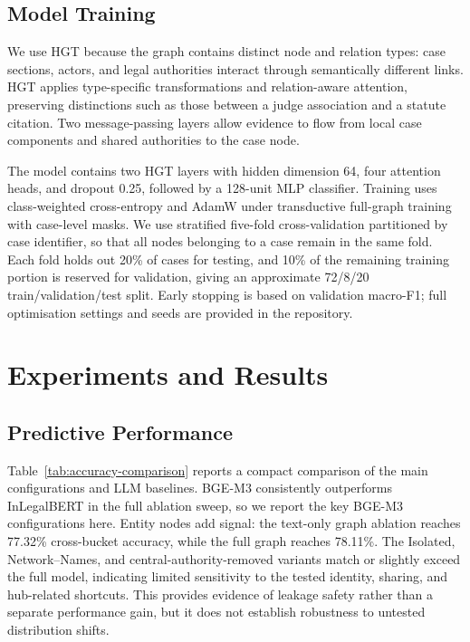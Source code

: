 \documentclass[runningheads]{llncs}
\begin{document}
\subsection{Model Training}
\label{subsec:pipeline-training}

We use HGT because the graph contains distinct node and relation types:
case sections, actors, and legal authorities interact through semantically
different links. HGT applies type-specific transformations and
relation-aware attention, preserving distinctions such as those between a
judge association and a statute citation. Two message-passing layers allow
evidence to flow from local case components and shared authorities to the
case node.

The model contains two HGT layers with hidden dimension 64, four attention
heads, and dropout 0.25, followed by a 128-unit MLP classifier. Training uses
class-weighted cross-entropy and AdamW under transductive full-graph training
with case-level masks. We use stratified five-fold cross-validation partitioned by case
identifier, so that all nodes belonging to a case remain in the same
fold. Each fold holds out 20\% of cases for testing, and 10\% of the
remaining training portion is reserved for validation, giving an
approximate 72/8/20 train/validation/test split. Early stopping is based
on validation macro-F1; full optimisation settings and seeds are provided in
the repository. 



\section{Experiments and Results}
\label{sec:results}

\subsection{Predictive Performance}

Table~\ref{tab:accuracy-comparison} reports a compact comparison of the main configurations and LLM baselines. BGE-M3 consistently outperforms InLegalBERT in the full ablation sweep, so we report the key BGE-M3 configurations here. Entity nodes add signal: the text-only graph ablation reaches 77.32\% cross-bucket accuracy, while the full graph reaches 78.11\%. The Isolated, Network--Names, and
central-authority-removed variants match or slightly exceed the full model,
indicating limited sensitivity to the tested identity, sharing, and
hub-related shortcuts. This provides evidence of leakage safety rather than
a separate performance gain, but it does not establish robustness to
untested distribution shifts.
\end{document}
